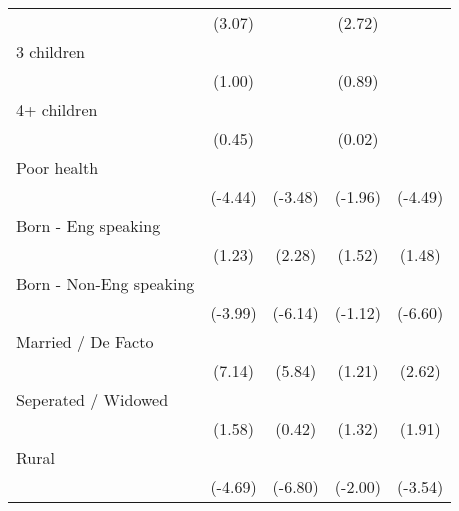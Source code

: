 {\begin{tabular}{l*{4}{c}}
                    &      (3.07)         &                     &      (2.72)         &                     \\
[1em]
3 children          &                     &                     &                     &                     \\
                    &      (1.00)         &                     &      (0.89)         &                     \\
[1em]
4+ children         &                     &                     &                     &                     \\
                    &      (0.45)         &                     &      (0.02)         &                     \\
[1em]
Poor health         &            \sym{***}&            \sym{***}&                     &            \sym{***}\\
                    &     (-4.44)         &     (-3.48)         &     (-1.96)         &     (-4.49)         \\
[1em]
Born - Eng speaking &                     &            \sym{*}  &                     &                     \\
                    &      (1.23)         &      (2.28)         &      (1.52)         &      (1.48)         \\
[1em]
Born - Non-Eng speaking&            \sym{***}&            \sym{***}&                     &            \sym{***}\\
                    &     (-3.99)         &     (-6.14)         &     (-1.12)         &     (-6.60)         \\
[1em]
Married / De Facto  &            \sym{***}&            \sym{***}&                     &            \sym{**} \\
                    &      (7.14)         &      (5.84)         &      (1.21)         &      (2.62)         \\
[1em]
Seperated / Widowed &                     &                     &                     &                     \\
                    &      (1.58)         &      (0.42)         &      (1.32)         &      (1.91)         \\
[1em]
Rural               &            \sym{***}&            \sym{***}&            \sym{*}  &            \sym{***}\\
                    &     (-4.69)         &     (-6.80)         &     (-2.00)         &     (-3.54)         \\

\end{tabular}}
